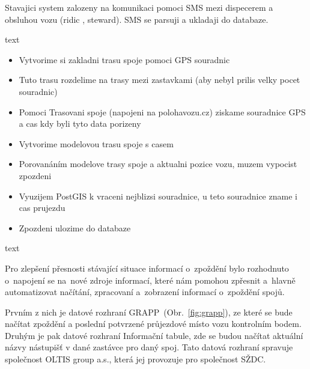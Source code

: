 

Stavajici system zalozeny na komunikaci pomoci SMS mezi dispecerem a obsluhou vozu (ridic , steward). SMS se parsuji a ukladaji do databaze.

text

\begin{itemize}
	\item Vytvorime si zakladni trasu spoje pomoci GPS souradnic
	\item Tuto trasu rozdelime na trasy mezi zastavkami (aby nebyl prilis velky pocet souradnic)
	\item Pomoci Trasovani spoje (napojeni na polohavozu.cz) ziskame souradnice GPS a cas kdy byli tyto data porizeny
	\item Vytvorime modelovou trasu spoje s casem
	\item Porovanáním modelove trasy spoje a aktualni pozice vozu, muzem vypocist zpozdeni
	\item Vyuzijem PostGIS k vraceni nejblizsi souradnice, u teto souradnice zname i cas prujezdu
	\item Zpozdeni ulozime do databaze
\end{itemize}

text


Pro zlepšení přesnosti stávající situace informací o~zpoždění bylo rozhodnuto o~napojení se na~nové zdroje informací, které nám pomohou zpřesnit a~hlavně automatizovat načítání, zpracovaní a~zobrazení informací o~zpoždění spojů.

Prvním z nich je datové rozhraní GRAPP~(Obr.~\ref{fig:grapp}), ze které se bude načítat zpoždění a poslední potvrzené průjezdové místo vozu kontrolním bodem. Druhým je pak datové rozhraní Informační tabule, zde se budou načítat aktuální názvy nástupišť v dané zastávce pro daný spoj. Tato datová rozhraní spravuje společnost OLTIS group a.s., která jej provozuje pro společnost SŽDC.


